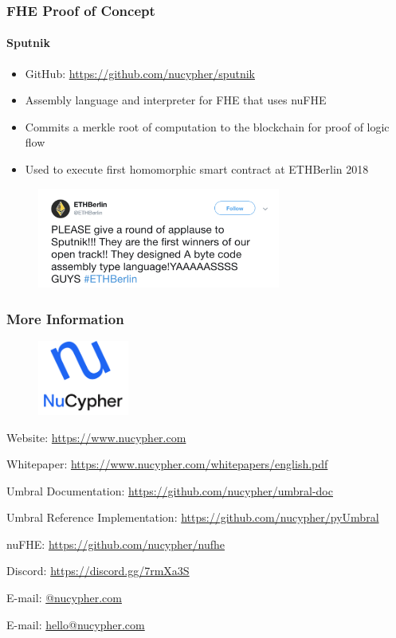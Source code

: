 \documentclass[xetex,mathsans,sans,aspectratio=169]{beamer}
\begin{document}
    \begin{frame}
      \frametitle{FHE Proof of Concept}
      \framesubtitle{Sputnik}
      \begin{itemize}
        \item GitHub: \url{https://github.com/nucypher/sputnik}
        \item Assembly language and interpreter for FHE that uses nuFHE
        \item Commits a merkle root of computation to the blockchain for proof of logic flow
        \item Used to execute first homomorphic smart contract at ETHBerlin 2018
      \end{itemize}
      \begin{figure}
        \centering
        \includegraphics[width=8cm]{pdf/sputnik-tweet.pdf}
      \end{figure}
    \end{frame}

    \begin{frame}
        \frametitle{More Information}
        \begin{figure}
            \centering
            \includegraphics[width=3cm]{pdf/nucypher_logo.pdf}
        \end{figure}
        Website: \url{https://www.nucypher.com}

        Whitepaper: \url{https://www.nucypher.com/whitepapers/english.pdf}

        Umbral Documentation: \url{https://github.com/nucypher/umbral-doc}

        Umbral Reference Implementation: \url{https://github.com/nucypher/pyUmbral}

        nuFHE: \url{https://github.com/nucypher/nufhe}

        Discord: \url{https://discord.gg/7rmXa3S}

        E-mail: \href{mailto:\emailname @nucypher.com}{\emailname @nucypher.com}

        E-mail: \href{mailto:hello@nucypher.com}{hello@nucypher.com}
    \end{frame}
\end{document}
